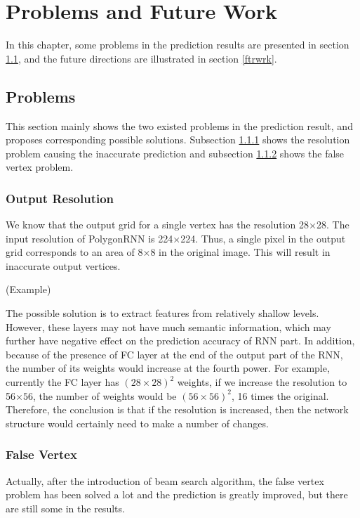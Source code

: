 \chapter{Problems and Future Work}

In this chapter, some problems in the prediction results are presented in section \ref{prblms}, and the future directions are illustrated in section \ref{ftrwrk}.

\section{Problems}\label{prblms}

This section mainly shows the two existed problems in the prediction result, and proposes corresponding possible solutions. Subsection \ref{outres} shows the resolution problem causing the inaccurate prediction and subsection \ref{flsvtx} shows the false vertex problem.

\subsection{Output Resolution}\label{outres}
We know that the output grid for a single vertex has the resolution 28$\times$28. The input resolution of PolygonRNN is 224$\times$224. Thus, a single pixel in the output grid corresponds to an area of 8$\times$8 in the original image. This will result in inaccurate output vertices.

(Example)

The possible solution is to extract features from relatively shallow levels. However, these layers may not have much semantic information, which may further have negative effect on the prediction accuracy of RNN part. In addition, because of the presence of FC layer at the end of the output part of the RNN, the number of its weights would increase at the fourth power. For example, currently the FC layer has $(28\times28)^2$ weights, if we increase the resolution to 56$\times56$, the number of weights would be $(56\times56)^2$, 16 times the original. Therefore, the conclusion is that if the resolution is increased, then the network structure would certainly need to make a number of changes.

\subsection{False Vertex}\label{flsvtx}
Actually, after the introduction of beam search algorithm, the false vertex problem has been solved a lot and the prediction is greatly improved, but there are still some in the results.

